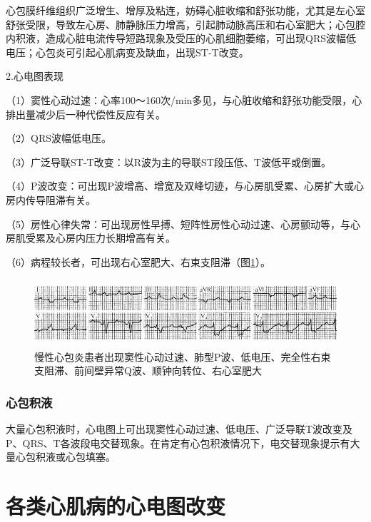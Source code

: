 心包膜纤维组织广泛增生、增厚及粘连，妨碍心脏收缩和舒张功能，尤其是左心室舒张受限，导致左心房、肺静脉压力增高，引起肺动脉高压和右心室肥大；心包腔内积液，造成心脏电流传导短路现象及受压的心肌细胞萎缩，可出现QRS波幅低电压；心包炎可引起心肌病变及缺血，出现ST-T改变。

2.心电图表现

（1）窦性心动过速：心率100～160次/min多见，与心脏收缩和舒张功能受限，心排出量减少后一种代偿性反应有关。

（2）QRS波幅低电压。

（3）广泛导联ST-T改变：以R波为主的导联ST段压低、T波低平或倒置。

（4）P波改变：可出现P波增高、增宽及双峰切迹，与心房肌受累、心房扩大或心房内传导阻滞有关。

（5）房性心律失常：可出现房性早搏、短阵性房性心动过速、心房颤动等，与心房肌受累及心房内压力长期增高有关。

（6）病程较长者，可出现右心室肥大、右束支阻滞（图\ref{fig42-10}）。

\begin{figure}[!htbp]
 \centering
 \includegraphics[width=5.58333in,height=0.98958in]{./images/Image00703.jpg}
 \captionsetup{justification=centering}
 \caption{慢性心包炎患者出现窦性心动过速、肺型P波、低电压、完全性右束支阻滞、前间壁异常Q波、顺钟向转位、右心室肥大}
 \label{fig42-10}
  \end{figure} 

\protect\hypertarget{text00050.htmlux5cux23subid613}{}{}

\subsection{心包积液}

大量心包积液时，心电图上可出现窦性心动过速、低电压、广泛导联T波改变及P、QRS、T各波段电交替现象。在肯定有心包积液情况下，电交替现象提示有大量心包积液或心包填塞。

\protect\hypertarget{text00051.html}{}{}

\protect\hypertarget{text00051.htmlux5cux23chapter51}{}{}

\chapter{各类心肌病的心电图改变}

